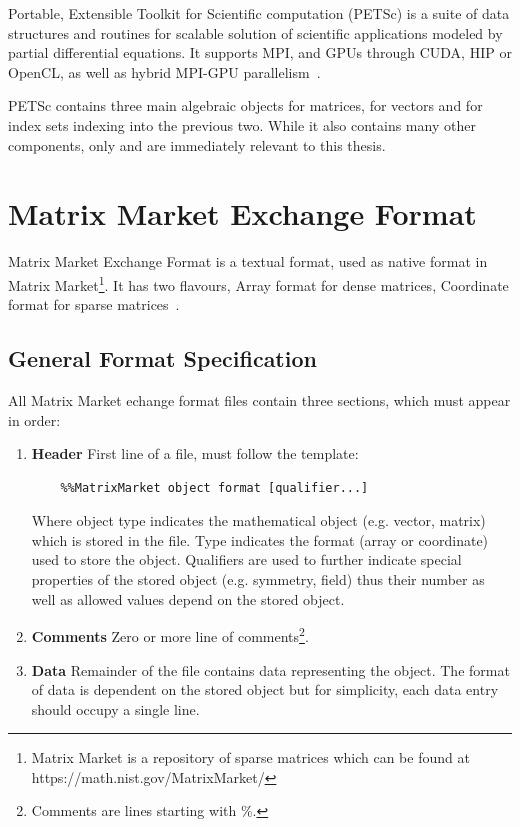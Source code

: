 \documentclass[thesis=M,english]{FITthesis}[2019/12/23]
\begin{document}
Portable, Extensible Toolkit for Scientific computation (PETSc) is a suite of data structures and routines
for scalable solution of scientific applications modeled by partial differential equations.
It supports MPI, and GPUs through CUDA, HIP or OpenCL, as well as hybrid MPI-GPU parallelism~\cite{petsc-web-page}.

PETSc contains three main algebraic objects  for matrices,  for vectors and 
for index sets indexing into the previous two. While it also contains many other components, only 
and  are immediately relevant to this thesis.


\section{Matrix Market Exchange Format}\label{theory:MMEF}

Matrix Market Exchange Format is a textual format, used as native format in Matrix Market\footnote{
    Matrix Market is a repository of sparse matrices which can be found at https://math.nist.gov/MatrixMarket/
}.
It has two flavours, Array format for dense matrices, Coordinate format for sparse matrices~\cite{mmef}.


\subsection{General Format Specification}

All Matrix Market echange format files contain three sections, which must appear in order:

\begin{enumerate}
    \item \textbf{Header} First line of a file, must follow the template:
          \begin{lstlisting}
    %%MatrixMarket object format [qualifier...]
\end{lstlisting}
          Where object type indicates the mathematical object (e.g. vector, matrix) which is
          stored in the file. Type indicates the format (array or coordinate) used to store
          the object. Qualifiers are used to further indicate special properties of the stored
          object (e.g. symmetry, field) thus their number as well as allowed values depend on
          the stored object.
    \item \textbf{Comments} Zero or more line of comments\footnote{Comments are lines starting with \%.}.
    \item \textbf{Data} Remainder of the file contains data representing the object.
          The format of data is dependent on the stored object but for simplicity,
          each data entry should occupy a single line.
\end{enumerate}
\end{document}
